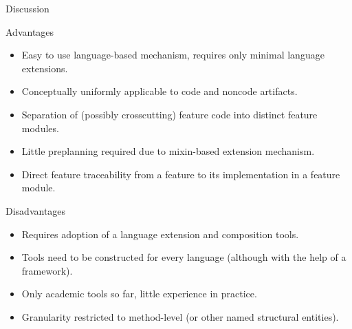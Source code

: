 \begin{frame}{Discussion}
	\begin{mycolumns}[widths={50,50},animation=none]
		\begin{note}{Advantages}
			\begin{itemize}
				\item Easy to use language-based mechanism, requires only minimal language extensions.
				\item Conceptually uniformly applicable to code and noncode artifacts.
				\item Separation of (possibly crosscutting) feature code into distinct feature modules.
				\item Little preplanning required due to mixin-based extension mechanism.
				\item Direct feature traceability from a feature to its implementation in a feature module.
			\end{itemize}
		\end{note}
	\mynextcolumn
		\begin{note}{Disadvantages}
			\begin{itemize}
				\item Requires adoption of a language extension and composition tools.
				\item Tools need to be constructed for every language (although with the help of a framework).
				\item Only academic tools so far, little experience in practice.
				\item Granularity restricted to method-level (or other named structural entities).
			\end{itemize}
		\end{note}
	\end{mycolumns}
\end{frame}

